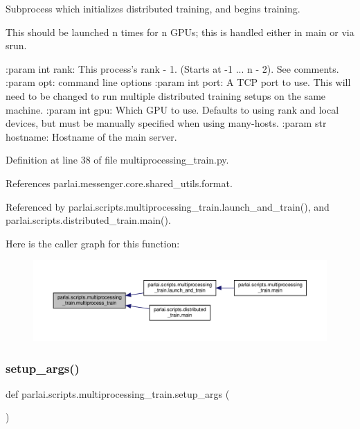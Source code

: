\begin{DoxyVerb}Subprocess which initializes distributed training, and begins training.

This should be launched n times for n GPUs; this is handled either in main
or via srun.

:param int rank: This process's rank - 1. (Starts at -1 ... n - 2). See comments.
:param opt: command line options
:param int port: A TCP port to use. This will need to be changed to run
    multiple distributed training setups on the same machine.
:param int gpu: Which GPU to use. Defaults to using rank and local devices,
    but must be manually specified when using many-hosts.
:param str hostname: Hostname of the main server.
\end{DoxyVerb}
 

Definition at line 38 of file multiprocessing\+\_\+train.\+py.



References parlai.\+messenger.\+core.\+shared\+\_\+utils.\+format.



Referenced by parlai.\+scripts.\+multiprocessing\+\_\+train.\+launch\+\_\+and\+\_\+train(), and parlai.\+scripts.\+distributed\+\_\+train.\+main().

Here is the caller graph for this function\+:
\nopagebreak
\begin{figure}[H]
\begin{center}
\leavevmode
\includegraphics[width=350pt]{namespaceparlai_1_1scripts_1_1multiprocessing__train_aa979267c9eb44bbdfcd25a6d69a58cc4_icgraph}
\end{center}
\end{figure}
\mbox{\label{namespaceparlai_1_1scripts_1_1multiprocessing__train_a1ee26bddeb470040cfbceb5ee7a9fa08}} 
\subsubsection{\texorpdfstring{setup\+\_\+args()}{setup\_args()}}
{\footnotesize\ttfamily def parlai.\+scripts.\+multiprocessing\+\_\+train.\+setup\+\_\+args (\begin{DoxyParamCaption}{ }\end{DoxyParamCaption})}



